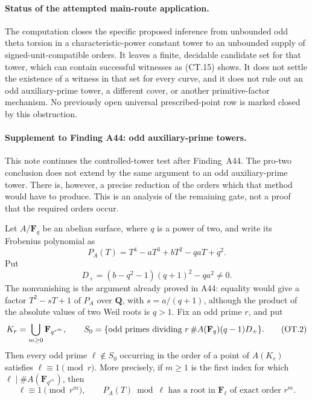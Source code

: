 \documentclass[11pt,a4paper]{article}
\begin{document}
\paragraph{Status of the attempted main-route application.}
The computation closes the specific proposed inference from
unbounded odd theta torsion in a characteristic-power constant
tower to an unbounded supply of signed-unit-compatible orders.
It leaves a finite, decidable candidate set for that tower,
which can contain successful witnesses as (CT.15) shows.
It does not settle the existence of a witness in that set for
every curve, and it does not rule out an odd auxiliary-prime
tower, a different cover, or another primitive-factor mechanism.
No previously open universal prescribed-point row is marked
closed by this obstruction.


\paragraph{Supplement to Finding A44: odd auxiliary-prime towers.}

This note continues the controlled-tower test after Finding~A44.
The pro-two conclusion does not extend by the same argument to an
odd auxiliary-prime tower.  There is, however, a precise reduction
of the orders which that method would have to produce.  This is
an analysis of the remaining gate, not a proof that the required
orders occur.

Let $A/\mathbf F_q$ be an abelian surface, where $q$ is a power
of two, and write its Frobenius polynomial as
\[
 P_A(T)=T^4-aT^3+bT^2-qaT+q^2.
\]
Put
\[
 D_+=(b-q^2-1)(q+1)^2-qa^2\ne0.
 \tag{OT.1}
\]
The nonvanishing is the argument already proved in A44: equality
would give a factor $T^2-sT+1$ of $P_A$ over $\mathbf Q$, with
$s=a/(q+1)$, although the product of the absolute values of two
Weil roots is $q>1$.
Fix an odd prime $r$, and put
\[
 K_r=\bigcup_{m\ge0}\mathbf F_{q^{r^m}},\qquad
 S_0=\{\hbox{odd primes dividing }
           r\,\#A(\mathbf F_q)(q-1)D_+\}.
 \tag{OT.2}
\]
Then every odd prime $\ell\notin S_0$ occurring in the order of a
point of $A(K_r)$ satisfies $\ell\equiv1\pmod r$.
More precisely, if $m\ge1$ is the first index for which
$\ell\mid\#A(\mathbf F_{q^{r^m}})$, then
\[
 \ell\equiv1\pmod{r^m},
 \qquad P_A(T)\bmod\ell
 \text{ has a root in }\mathbf F_\ell
 \text{ of exact order }r^m.
 \tag{OT.3}
\]
\end{document}
